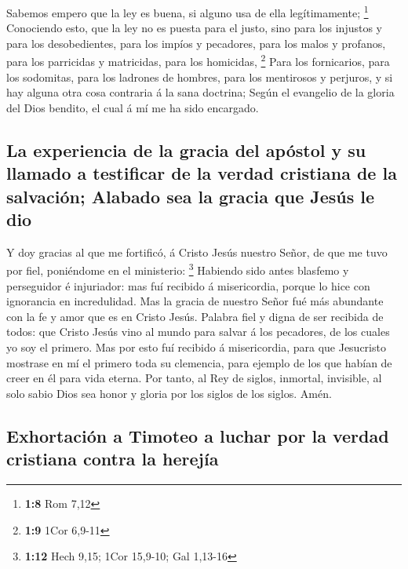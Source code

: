  Sabemos empero que la ley es buena, si alguno usa de ella
legítimamente; \footnote{\textbf{1:8} Rom 7,12}  Conociendo
esto, que la ley no es puesta para el justo, sino para los injustos y
para los desobedientes, para los impíos y pecadores, para los malos y
profanos, para los parricidas y matricidas, para los homicidas,
\footnote{\textbf{1:9} 1Cor 6,9-11}  Para los fornicarios,
para los sodomitas, para los ladrones de hombres, para los mentirosos y
perjuros, y si hay alguna otra cosa contraria á la sana doctrina;
 Según el evangelio de la gloria del Dios bendito, el cual
á mí me ha sido encargado.

\hypertarget{la-experiencia-de-la-gracia-del-apuxf3stol-y-su-llamado-a-testificar-de-la-verdad-cristiana-de-la-salvaciuxf3n-alabado-sea-la-gracia-que-jesuxfas-le-dio}{%
\subsection{La experiencia de la gracia del apóstol y su llamado a
testificar de la verdad cristiana de la salvación; Alabado sea la gracia
que Jesús le
dio}\label{la-experiencia-de-la-gracia-del-apuxf3stol-y-su-llamado-a-testificar-de-la-verdad-cristiana-de-la-salvaciuxf3n-alabado-sea-la-gracia-que-jesuxfas-le-dio}}

 Y doy gracias al que me fortificó, á Cristo Jesús nuestro
Señor, de que me tuvo por fiel, poniéndome en el ministerio: \footnote{\textbf{1:12}
  Hech 9,15; 1Cor 15,9-10; Gal 1,13-16}  Habiendo sido
antes blasfemo y perseguidor é injuriador: mas fuí recibido á
misericordia, porque lo hice con ignorancia en incredulidad.
 Mas la gracia de nuestro Señor fué más abundante con la fe
y amor que es en Cristo Jesús.  Palabra fiel y digna de ser
recibida de todos: que Cristo Jesús vino al mundo para salvar á los
pecadores, de los cuales yo soy el primero.  Mas por esto
fuí recibido á misericordia, para que Jesucristo mostrase en mí el
primero toda su clemencia, para ejemplo de los que habían de creer en él
para vida eterna.  Por tanto, al Rey de siglos, inmortal,
invisible, al solo sabio Dios sea honor y gloria por los siglos de los
siglos. Amén.

\hypertarget{exhortaciuxf3n-a-timoteo-a-luchar-por-la-verdad-cristiana-contra-la-herejuxeda}{%
\subsection{Exhortación a Timoteo a luchar por la verdad cristiana
contra la
herejía}\label{exhortaciuxf3n-a-timoteo-a-luchar-por-la-verdad-cristiana-contra-la-herejuxeda}}


